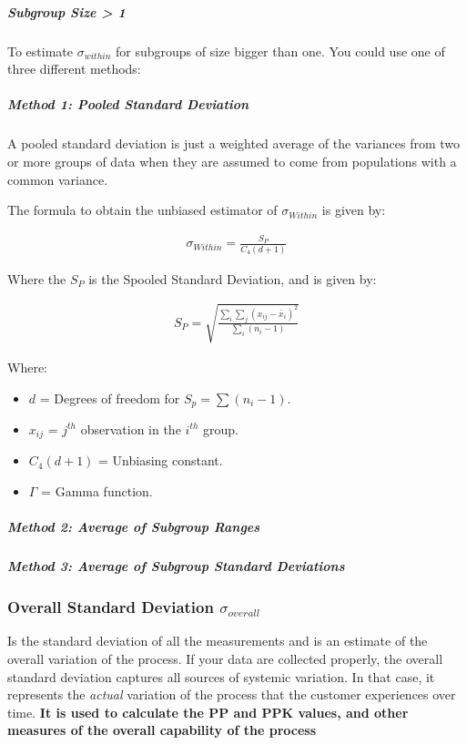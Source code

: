 \documentclass[11pt]{article}
\begin{document}
\hypertarget{todo.-subgroup-size-1}{%
\subparagraph{Subgroup Size \textgreater{} 1}\label{todo.-subgroup-size-1}}
To estimate \(\sigma_{within}\) for subgroups of size bigger than one. You could use
one of three different methods: 


\hypertarget{pooled-standard-deviation}{
\subparagraph*{Method 1: Pooled Standard Deviation}\label{pooled-standard-deviation}}
A pooled standard deviation is just a weighted average of the variances
from two or more groups of data when they are assumed to come from populations 
with a common variance.

The formula to obtain the unbiased estimator of \(\sigma_{Within}\) is given by:

\begin{gather}
  \sigma_{Within} = \frac{S_P}{C_4 (d+1)}
\end{gather}

Where the \(S_P\) is the Spooled Standard Deviation, and is given by: 

\begin{gather}
  S_P = \sqrt{\frac{\sum_i \sum_j (x_{ij} - \bar x_i)^2}{\sum_i(n_i - 1)}}
\end{gather}

Where: 
\begin{itemize}
  \item \(d\) = Degrees of freedom for \(S_p = \sum (n_i - 1)\).
  \item \(x_{ij}\) = \(j^{th}\) observation in the \(i^{th}\) group. 
  \item \(C_4(d+1)\) = Unbiasing constant.
  \item \(\Gamma\) = Gamma function.
\end{itemize}


\hypertarget{average-of-subgroup-ranges}{
\subparagraph*{Method 2: Average of Subgroup Ranges}\label{average-of-subgroup-ranges}}
  
\hypertarget{average-of-subgroup-standard-deviations}{
\subparagraph*{Method 3: Average of Subgroup Standard Deviations}\label{average-of-subgroup-standard-deviations}}


\hypertarget{overall-standard-deviation-sigma_overall}{%
\subsubsection{Overall Standard Deviation \(\sigma_{overall}\)}\label{overall-standard-deviation-sigma_overall}}
Is the standard deviation of all the measurements and is an
estimate of the overall variation of the process. If your data are
collected properly, the overall standard deviation captures all sources
of systemic variation. In that case, it represents the \emph{actual}
variation of the process that the customer experiences over time.
\textbf{It is used to calculate the PP and PPK values, and other
measures of the overall capability of the process}
\end{document}
